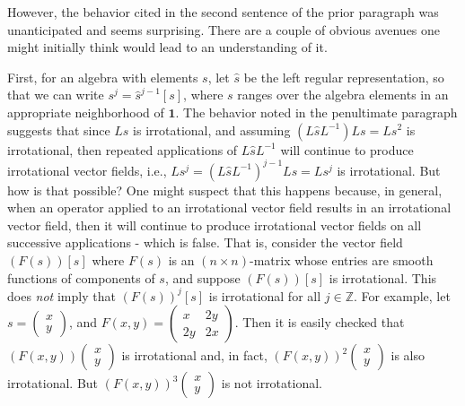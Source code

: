 \documentclass{amsart}
\theoremstyle{definition}
\numberwithin{theorem}{section}
\numberwithin{equation}{section}
\begin{document}
However, the behavior cited in the second sentence of the prior paragraph was unanticipated and seems surprising. There are a couple of obvious avenues one might initially think would lead to an understanding of it.

First, for an algebra with elements $s$, let $\hat{s}$ be the left regular representation, so that we can write $s^j = \hat{s}^{j-1}[s]$, where $s$ ranges over the algebra elements in an appropriate neighborhood of $\mathbf{1}$.  The behavior noted in the penultimate paragraph suggests that since $Ls$ is irrotational, and assuming $(L\hat{s}L^{-1})Ls = Ls^2$ is irrotational, then repeated applications of $L\hat{s}L^{-1}$ will continue to produce irrotational vector fields, i.e., $Ls^j = (L\hat{s}L^{-1})^{j-1}Ls = Ls^j$ is irrotational.  But how is that possible?
One might suspect that this happens because, in general, when an operator applied to an irrotational vector field results in an irrotational vector field, then it will continue to produce irrotational vector fields on all successive applications - which is false.  That is, consider the vector field $(F(s))[s]$ where $F(s)$ is an $(n\times n)$-matrix whose entries are smooth functions of components of $s$, and suppose $(F(s))[s]$ is irrotational.  This does {\it not} imply that $(F(s))^j[s]$ is irrotational for all $j\in\mathbb{Z}$. For example, let \mbox{$s=\left(\begin{array}{ccc}
 x   \\ 
y    
\end{array}\right)$,} and \mbox{$F(x,y)= \left(\begin{array}{ccc}
x  & 2y   \\ 
 2y & 2x    
\end{array}\right)$.}  Then it is easily checked that $(F(x,y))\left(\begin{array}{ccc}
 x   \\ 
y    
\end{array}\right)$ is \mbox{irrotational} and, in fact, $(F(x,y))^2\left(\begin{array}{ccc}
 x   \\ 
y    
\end{array}\right)$ is also irrotational.  But $(F(x,y))^3\left(\begin{array}{ccc}
 x   \\ 
y    
\end{array}\right)$ is not irrotational.  
\end{document}
